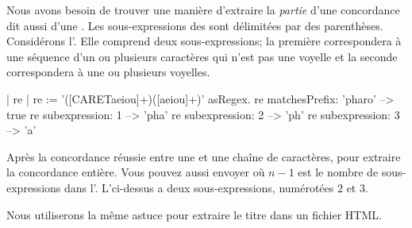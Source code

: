 \documentclass[a4paper,10pt,twoside]{book}
\begin{document}
Nous avons besoin de trouver une manière d'extraire la \emph{partie}
d'une concordance dit aussi \ind{\regexmatch} d'une \expreg. Les
sous-expressions des \expregs sont délimitées par des parenthèses.
Considérons l'\expreg \ct{([CARETaeiou]+)([aeiou]+)}. 
Elle comprend deux sous-expressions; la première correspondera à une
séquence d'un ou plusieurs caractères qui n'est pas une voyelle et la
seconde correspondera à une ou plusieurs voyelles. 


\begin{code}{| re |}
re := '([CARETaeiou]+)([aeiou]+)' asRegex.
re matchesPrefix: 'pharo' --> true
re subexpression: 1         --> 'pha'
re subexpression: 2         --> 'ph'
re subexpression: 3         --> 'a'
\end{code}

Après la concordance réussie entre une \expreg et une chaîne de
caractères,   pour extraire la
concordance entière.
Vous pouvez aussi envoyer  où $n-1$ est le
nombre de sous-expressions dans l'\expreg. L'\expreg ci-dessus a deux
sous-expressions, numérotées $2$ et $3$.

Nous utiliserons la même astuce pour extraire le titre dans un fichier
HTML.
\end{document}
